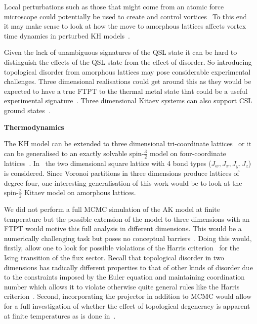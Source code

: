 Local perturbations such as those that might come from an atomic force microscope could potentially be used to create and control vortices~\autocite{jangVortexCreationControl2021} To this end it may make sense to look at how the move to amorphous lattices affects vortex time dynamics in perturbed KH models~\autocite{joyDynamicsVisonsThermal2022}.

Given the lack of unambiguous signatures of the QSL state it can be hard to distinguish the effects of the QSL state from the effect of disorder. So introducing topological disorder from amorphous lattices may pose considerable experimental challenges. Three dimensional realisations could get around this as they would be expected to have a true FTPT to the thermal metal state that could be a useful experimental signature~\autocite{eschmannThermodynamicClassificationThreedimensional2020,OBrienPRB2016}. Three dimensional Kitaev systems can also support CSL ground states~\autocite{mishchenkoChiralSpinLiquids2020}.

\textbf{Thermodynamics}

The KH model can be extended to three dimensional tri-coordinate lattices~\autocite{eschmannThermodynamicClassificationThreedimensional2020,OBrienPRB2016} or it can be generalised to an exactly solvable spin-\(\tfrac{3}{2}\) model on four-coordinate lattices~\autocite{yaoAlgebraicSpinLiquid2009,wenQuantumOrderStringnet2003,ryuThreedimensionalTopologicalPhase2009,Baskaran2008,Nussinov2009,Yao2011,Chua2011,Natori2020,Chulliparambil2020,Chulliparambil2021,Seifert2020,WangHaoranPRB2021,Wu2009}. In~\autocite{yaoAlgebraicSpinLiquid2009} the two dimensional square lattice with 4 bond types (\(J_w, J_x, J_y, J_z\)) is considered. Since Voronoi partitions in three dimensions produce lattices of degree four, one interesting generalisation of this work would be to look at the spin-\(\tfrac{3}{2}\) Kitaev model on amorphous lattices.

We did not perform a full MCMC simulation of the AK model at finite temperature but the possible extension of the model to three dimensions with an FTPT would motive this full analysis in different dimensions. This would be a numerically challenging task but poses no conceptual barriers~\autocite{Laumann2012,lahtinenTopologicalLiquidNucleation2012,selfThermallyInducedMetallic2019}. Doing this would, firstly, allow one to look for possible violations of the Harris criterion~\autocite{harrisEffectRandomDefects1974} for the Ising transition of the flux sector. Recall that topological disorder in two dimensions has radically different properties to that of other kinds of disorder due to the constraints imposed by the Euler equation and maintaining coordination number which allows it to violate otherwise quite general rules like the Harris criterion~\autocite{barghathiPhaseTransitionsRandom2014,schrauthViolationHarrisBarghathiVojtaCriterion2018}. Second, incorporating the projector in addition to MCMC would allow for a full investigation of whether the effect of topological degeneracy is apparent at finite temperatures as is done in~\autocite{selfThermallyInducedMetallic2019}.

